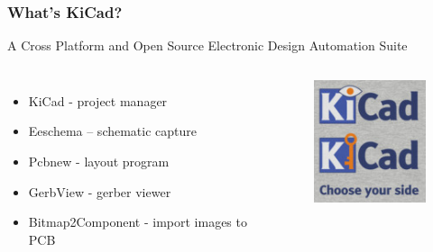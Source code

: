 \documentclass[t]{beamer}
\begin{document}
\begin{frame}[t]
\frametitle{What's KiCad?}

	A Cross Platform and Open Source Electronic Design Automation Suite
	
	\begin{columns}
		\begin{itemize}
			\item KiCad - project manager
			\item Eeschema – schematic capture
			\item Pcbnew - layout program
			\item GerbView - gerber viewer
			\item Bitmap2Component - import images to PCB
		\end{itemize}
		
		
			\begin{figure}
			\includegraphics[width=1\linewidth]{kikeycad.png}
		\end{figure}
		
	\end{columns}


\end{frame}
\end{document}
